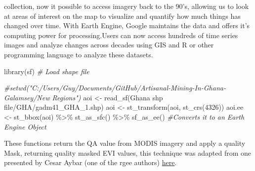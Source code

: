 \documentclass[
]{report}
\newenvironment{Shaded}{\begin{snugshade}}{\end{snugshade}}
\newcommand{\CommentTok}[1]{\textcolor[rgb]{0.56,0.35,0.01}{\textit{#1}}}
\newcommand{\DecValTok}[1]{\textcolor[rgb]{0.00,0.00,0.81}{#1}}
\newcommand{\FunctionTok}[1]{\textcolor[rgb]{0.00,0.00,0.00}{#1}}
\newcommand{\NormalTok}[1]{#1}
\newcommand{\OtherTok}[1]{\textcolor[rgb]{0.56,0.35,0.01}{#1}}
\newcommand{\SpecialCharTok}[1]{\textcolor[rgb]{0.00,0.00,0.00}{#1}}
\newcommand{\StringTok}[1]{\textcolor[rgb]{0.31,0.60,0.02}{#1}}
\begin{document}
collection, now it possible to access imagery back to the 90's, allowing
us to look at areas of interest on the map to visualize and quantify how
much things has changed over time. With Earth Engine, Google maintains
the data and offers it's computing power for processing.Users can now
access hundreds of time series images and analyze changes across decades
using GIS and R or other programming language to analyze these datasets.

\begin{Shaded}
\begin{Highlighting}[]
\FunctionTok{library}\NormalTok{(}\StringTok{\textquotesingle{}sf\textquotesingle{}}\NormalTok{)}
\CommentTok{\# Load shape file}

\CommentTok{\#setwd("C:/Users/Guy/Documents/GitHub/Artisanal{-}Mining{-}In{-}Ghana{-}Galamsey/New Regions")}
\NormalTok{aoi }\OtherTok{\textless{}{-}} \FunctionTok{read\_sf}\NormalTok{(}\StringTok{\textquotesingle{}Ghana shp file/GHA/gadm41\_GHA\_1.shp\textquotesingle{}}\NormalTok{)}
\NormalTok{aoi }\OtherTok{\textless{}{-}} \FunctionTok{st\_transform}\NormalTok{(aoi, }\FunctionTok{st\_crs}\NormalTok{(}\DecValTok{4326}\NormalTok{))}
\NormalTok{aoi.ee }\OtherTok{\textless{}{-}} \FunctionTok{st\_bbox}\NormalTok{(aoi) }\SpecialCharTok{\%\textgreater{}\%} 
\FunctionTok{st\_as\_sfc}\NormalTok{() }\SpecialCharTok{\%\textgreater{}\%} 
\FunctionTok{sf\_as\_ee}\NormalTok{() }\CommentTok{\#Converts it to an Earth Engine Object}
\end{Highlighting}
\end{Shaded}

These functions return the QA value from MODIS imagery and apply a
quality Mask, returning quality masked EVI values, this technique was
adapted from one presented by Cesar Aybar (one of the rgee authors)
\href{https://csaybar.github.io/blog/2020/06/15/rgee_02_io/}{here}.
\end{document}
